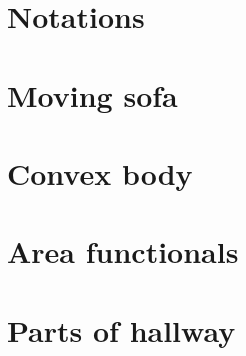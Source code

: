 
\section{Notations}
\label{sec:notations}


\section{Moving sofa}
\label{sec:moving-sofa}


\section{Convex body}
\label{sec:convex-body}


\section{Area functionals}
\label{sec:area-functionals}


\section{Parts of hallway}
\label{sec:parts-of-hallway}


